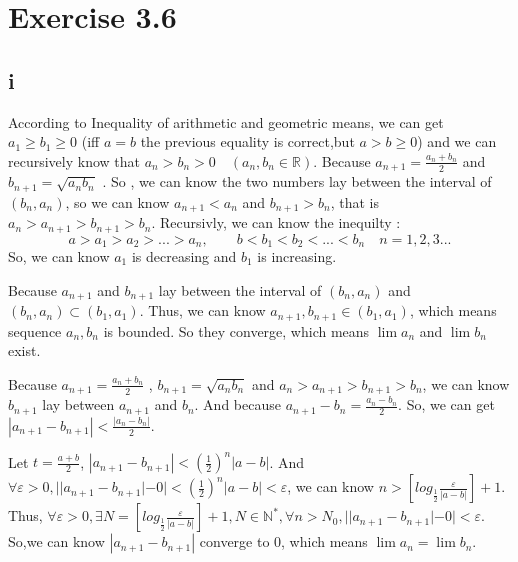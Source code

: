 \documentclass[11pt,twoside,a4paper]{article}
\begin{document}
\section{Exercise 3.6}
\subsection{i}
According to Inequality of arithmetic and geometric means, we can get $a_{1}\ge b_{1}\ge0$ (iff $a=b$ the previous equality is correct,but $a>b\ge 0$) and we can recursively know that  $a_{n}>b_{n}>0\quad(a_{n},b_{n}\in \mathbb{R})$. Because $\displaystyle a_{n+1}=\frac{a_{n}+b_{n}}{2}$ and $\displaystyle b_{n+1}=\sqrt{a_{n}b_{n}}$ . So , we can know the two numbers lay between the interval of $(b_{n},a_{n})$, so we can know $a_{n+1}<a_{n}$ and $b_{n+1}>b_{n}$, that is $a_{n}>a_{n+1}>b_{n+1}>b_{n}$. Recursivly, we can know the inequilty :
$$a>a_{1}>a_{2}> ... >a_{n},\quad \quad b<b_{1}<b_{2}< ... <b_{n}\quad n=1,2,3...$$
So, we can know  $a_{1}$ is decreasing and $b_{1}$ is increasing.
\par\noindent
Because  $a_{n+1}$ and $b_{n+1}$ lay between the interval of $(b_{n},a_{n})$ and $(b_{n},a_{n}) \subset (b_{1},a_{1})$. Thus, we can know $a_{n+1},b_{n+1}\in (b_{1},a_{1})$, which means sequence $a_{n},b_{n}$ is bounded. So they converge, which means $\lim a_{n}$ and  $\lim b_{n}$ exist.
\par\noindent
Because $\displaystyle a_{n+1}=\frac{a_{n}+b_{n}}{2}$ , $\displaystyle b_{n+1}=\sqrt{a_{n}b_{n}}$ and  $a_{n}>a_{n+1}>b_{n+1}>b_{n}$, we can know $b_{n+1}$ lay between $a_{n+1}$ and $b_{n}$. And because $\displaystyle a_{n+1}-b_{n}=\frac{a_{n}-b_{n}}{2}$. So, we can get $\displaystyle |a_{n+1}-b_{n+1}|< \frac{|a_{n}-b_{n}|}{2}$.
\par\noindent
Let $\displaystyle t=\frac{a+b}{2}$, $\displaystyle |a_{n+1}-b_{n+1}|< (\frac{1}{2})^{n}|a-b|$.  And $\displaystyle\forall\varepsilon>0,| |a_{n+1}-b_{n+1}|-0|< (\frac{1}{2})^{n}|a-b|<\varepsilon$, we can know $\displaystyle n>\left[log_{\frac{1}{2}}{\frac{\varepsilon}{|a-b|}} \right]+1$. Thus, $\displaystyle\forall\varepsilon>0,\exists N=\left[log_{\frac{1}{2}}{\frac{\varepsilon}{|a-b|}} \right]+1, N\in \mathbb{N}^*,\forall n>N_{0},| |a_{n+1}-b_{n+1}|-0|<\varepsilon$. So,we can know $|a_{n+1}-b_{n+1}|$ converge to 0, which means $\lim a_{n}=\lim b_{n}$.
\end{document}
